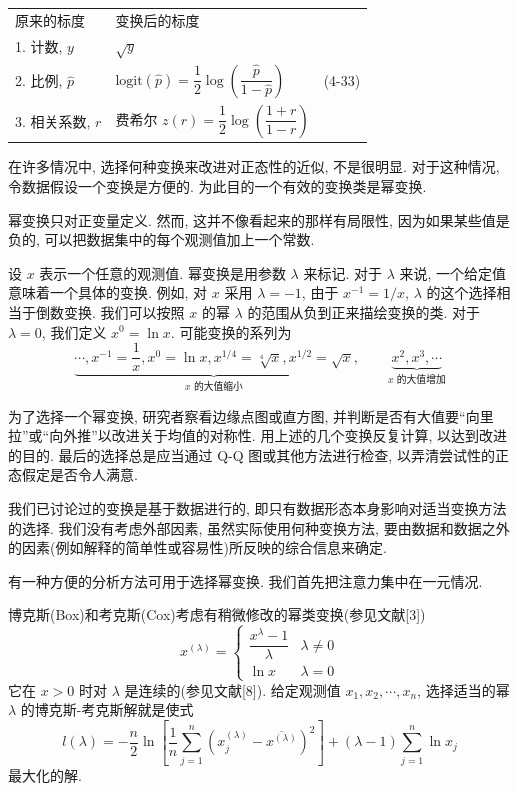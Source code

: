 
\begin{mvframe}[向正态性接近的有用变换]
\begin{tabular}{llr}
原来的标度 & 变换后的标度 & \\
1. 计数, $y$ & $\sqrt{y}$ & \\
2. 比例, $\hat{p}$ & $\mathrm{logit}(\hat{p}) = \dfrac{1}{2}\log\left(\dfrac{\hat{p}}{1-\hat{p}}\right)$ & (4-33)\\
3. 相关系数, $r$ & 费希尔 $z(r) = \dfrac{1}{2}\log\left(\dfrac{1+r}{1-r}\right)$ & \\
\end{tabular}
\end{mvframe}

在许多情况中, 选择何种变换来改进对正态性的近似, 不是很明显. 对于这种情况, 令数据假设一个变换是方便的. 为此目的一个有效的变换类是幂变换.

幂变换只对正变量定义. 然而, 这并不像看起来的那样有局限性, 因为如果某些值是负的, 可以把数据集中的每个观测值加上一个常数.

设 $x$ 表示一个任意的观测值. 幂变换是用参数 $\lambda$ 来标记. 对于 $\lambda$ 来说, 一个给定值意味着一个具体的变换. 例如, 对 $x$ 采用 $\lambda = -1$, 由于 $x^{-1} = 1/x$, $\lambda$ 的这个选择相当于倒数变换. 我们可以按照 $x$ 的幂 $\lambda$ 的范围从负到正来描绘变换的类. 对于 $\lambda = 0$, 我们定义 $x^0 = \ln x$. 可能变换的系列为
\[
\underbrace{\cdots, x^{-1} = \frac{1}{x}, x^0 = \ln x, x^{1/4} = \sqrt[4]{x}, x^{1/2} = \sqrt{x}}_{x\text{ 的大值缩小}}, \qquad \underbrace{x^2, x^3, \cdots}_{x\text{ 的大值增加}}
\]

为了选择一个幂变换, 研究者察看边缘点图或直方图, 并判断是否有大值要“向里拉”或“向外推”以改进关于均值的对称性. 用上述的几个变换反复计算, 以达到改进的目的. 最后的选择总是应当通过 Q-Q 图或其他方法进行检查, 以弄清尝试性的正态假定是否令人满意.

我们已讨论过的变换是基于数据进行的, 即只有数据形态本身影响对适当变换方法的选择. 我们没有考虑外部因素, 虽然实际使用何种变换方法, 要由数据和数据之外的因素(例如解释的简单性或容易性)所反映的综合信息来确定.

有一种方便的分析方法可用于选择幂变换. 我们首先把注意力集中在一元情况.

博克斯(Box)和考克斯(Cox)考虑有稍微修改的幂类变换(参见文献[3])
\label{eq:4-34}
\begin{equation}
x^{(\lambda)} = \begin{cases} \dfrac{x^\lambda - 1}{\lambda} & \lambda \neq 0 \\[2ex] \ln x & \lambda = 0 \end{cases} \tag{4-34}
\end{equation}
它在 $x>0$ 时对 $\lambda$ 是连续的(参见文献[8]). 给定观测值 $x_1, x_2, \cdots, x_n$, 选择适当的幂 $\lambda$ 的博克斯-考克斯解就是使式
\label{eq:4-35}
\begin{equation}
l(\lambda) = -\frac{n}{2}\ln\left[\frac{1}{n}\sum_{j=1}^{n}\left(x_j^{(\lambda)} - \overline{x^{(\lambda)}}\right)^2\right] + (\lambda - 1)\sum_{j=1}^{n}\ln x_j \tag{4-35}
\end{equation}
最大化的解.


